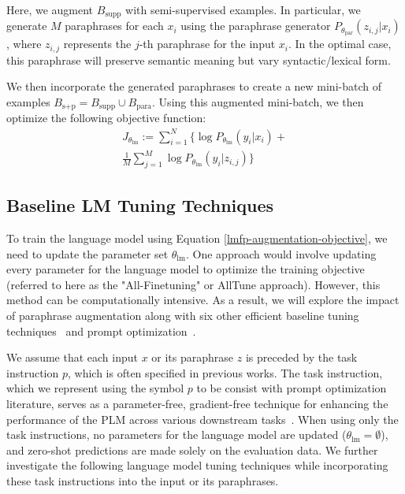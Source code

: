 \documentclass[11pt]{article}
\begin{document}
Here, we augment $B_{\text{supp}}$ with semi-supervised examples. In particular, we generate $M$ paraphrases for each $x_i$ using the paraphrase generator $P_{\theta_{\text{par}}} (z_{i,j} | x_i)$, where $z_{i,j}$ represents the $j$-th paraphrase for the input $x_i$.  In the optimal case, this paraphrase will preserve semantic meaning but vary syntactic/lexical form. 

We then incorporate the generated paraphrases to create a new mini-batch of examples $B_{\text{s+p}} = B_{\text{supp}} \cup B_{\text{para}}$.  Using this augmented mini-batch, we then optimize the following objective function:
\begin{multline}
J_{\theta_{\text{lm}}} := \sum_{i=1}^N \{\log P_{\theta_{\text{lm}}} (y_i | x_i) + \\
\frac{1}{M} \sum_{j=1}^{M} \log P_{\theta_{\text{lm}}} (y_i | z_{i,j})\}
\label{lmfp-augmentation-objective}
\end{multline}

\subsection{Baseline LM Tuning Techniques}
To train the language model using Equation \ref{lmfp-augmentation-objective}, we need to update the parameter set $\theta_{\text{lm}}$. One approach would involve updating every parameter for the language model to optimize the training objective (referred to here as the "All-Finetuning" or AllTune approach).  However, this method can be computationally intensive. As a result, we will explore the impact of paraphrase augmentation along with six other efficient baseline tuning techniques~\cite{pmlr-v97-houlsby19a} and prompt optimization~\cite{liu2021pretrain}.

We assume that each input $x$ or its paraphrase $z$ is preceded by the task instruction $p$, which is often specified in previous works. The task instruction, which we represent using the symbol $p$ to be consist with prompt optimization literature, serves as a parameter-free, gradient-free technique for enhancing the performance of the PLM across various downstream tasks~\cite{DBLP:journals/corr/abs-2005-14165, petroni-etal-2019-language, deng-etal-2022-rlprompt}. When using only the task instructions, no parameters for the language model are updated ($\theta_{\text{lm}}=\emptyset$), and zero-shot predictions are made solely on the evaluation data. We further investigate the following language model tuning techniques while incorporating these task instructions into the input or its paraphrases.
\end{document}
